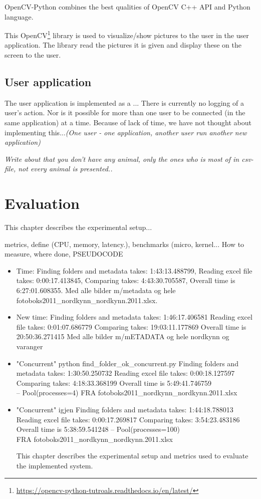 \documentclass[USenglish]{uit-thesis}
\begin{document}
OpenCV-Python combines the best qualities of OpenCV C++ API and Python language.

This OpenCV\footnote{\url{https://opencv-python-tutroals.readthedocs.io/en/latest/}} library is used to visualize/show pictures to the user in the user application. The library read the pictures it is given and display these on the screen to the user.

\section{User application} \label{sssec:user}
The user application is implemented as a ...
There is currently no logging of a user's action. Nor is it possible for more than one user to be connected (in the same application) at a time. Because of lack of time, we have not thought about implementing this...\textit{(One user - one application, another user run another new application)}

\textit{Write about that you don't have any animal, only the ones who is most of in csv-file, not every animal is presented..}


\chapter{Evaluation} 
This chapter describes the experimental setup...

metrics, define (CPU, memory, latency.), benchmarks (micro, kernel...
How to measure, where done, PSEUDOCODE

\begin{itemize}
\item Time: Finding folders and metadata takes:  1:43:13.488799,
Reading excel file takes:  0:00:17.413845,
Comparing takes:  4:43:30.705587,
Overall time is  6:27:01.608355.
Med alle bilder m/metadata og hele fotoboks2011\_nordkynn\_nordkynn.2011.xlsx.

\item New time: Finding folders and metadata takes:  1:46:17.406581
Reading excel file takes:  0:01:07.686779
Comparing takes:  19:03:11.177869
Overall time is  20:50:36.271415
Med alle bilder m/mETADATA og hele nordkynn og varanger

\item "Concurrent" python find\_folder\_ok\_concurrent.py 
Finding folders and metadata takes:  1:30:50.250732
Reading excel file takes:  0:00:18.127597
Comparing takes:  4:18:33.368199
Overall time is  5:49:41.746759
\\ -- Pool(processes=4)
FRA fotoboks2011\_nordkynn\_nordkynn.2011.xlsx

\item "Concurrent" igjen
Finding folders and metadata takes:  1:44:18.788013
Reading excel file takes:  0:00:17.269817
Comparing takes:  3:54:23.483186
Overall time is  5:38:59.541248
-- Pool(processes=100)
\\ FRA fotoboks2011\_nordkynn\_nordkynn.2011.xlsx

This chapter describes the experimental setup and metrics used to evaluate the implemented system. 

\end{itemize}
\end{document}
